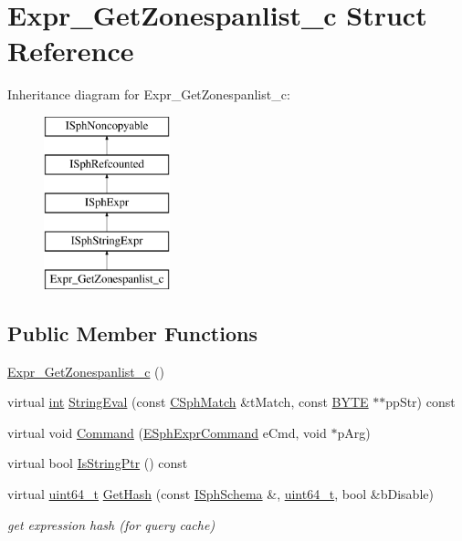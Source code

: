 \hypertarget{structExpr__GetZonespanlist__c}{\section{Expr\-\_\-\-Get\-Zonespanlist\-\_\-c Struct Reference}
\label{structExpr__GetZonespanlist__c}
}
Inheritance diagram for Expr\-\_\-\-Get\-Zonespanlist\-\_\-c\-:\begin{figure}[H]
\begin{center}
\leavevmode
\includegraphics[height=5.000000cm]{structExpr__GetZonespanlist__c}
\end{center}
\end{figure}
\subsection*{Public Member Functions}
\begin{DoxyCompactItemize}
\item 
\hyperlink{structExpr__GetZonespanlist__c_a22759e7af04ea46720bd33f884d397fd}{Expr\-\_\-\-Get\-Zonespanlist\-\_\-c} ()
\item 
virtual \hyperlink{sphinxexpr_8cpp_a4a26e8f9cb8b736e0c4cbf4d16de985e}{int} \hyperlink{structExpr__GetZonespanlist__c_a165f2ebcb6da2ce696785ff17cc50082}{String\-Eval} (const \hyperlink{classCSphMatch}{C\-Sph\-Match} \&t\-Match, const \hyperlink{sphinxstd_8h_a4ae1dab0fb4b072a66584546209e7d58}{B\-Y\-T\-E} $\ast$$\ast$pp\-Str) const 
\item 
virtual void \hyperlink{structExpr__GetZonespanlist__c_a5f1831c74c241ffb301109f8c7515667}{Command} (\hyperlink{sphinxexpr_8h_a30be184fb07bd80c271360fc6094c818}{E\-Sph\-Expr\-Command} e\-Cmd, void $\ast$p\-Arg)
\item 
virtual bool \hyperlink{structExpr__GetZonespanlist__c_a6b4c593735bbf86c7ce1612bf4c287f8}{Is\-String\-Ptr} () const 
\item 
virtual \hyperlink{sphinxstd_8h_aaa5d1cd013383c889537491c3cfd9aad}{uint64\-\_\-t} \hyperlink{structExpr__GetZonespanlist__c_aeb55627d577a48362c6a5bc5d6b0a961}{Get\-Hash} (const \hyperlink{classISphSchema}{I\-Sph\-Schema} \&, \hyperlink{sphinxstd_8h_aaa5d1cd013383c889537491c3cfd9aad}{uint64\-\_\-t}, bool \&b\-Disable)
\begin{DoxyCompactList}\small\item\em get expression hash (for query cache) \end{DoxyCompactList}\end{DoxyCompactItemize}

